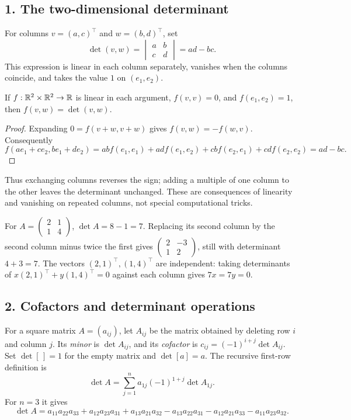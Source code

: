 
\subsection*{1. The two-dimensional determinant}
For columns \(v=(a,c)^\top\) and \(w=(b,d)^\top\), set
\[
 \det(v,w)=\begin{vmatrix}a&b\\c&d\end{vmatrix}=ad-bc.
\]
This expression is linear in each column separately, vanishes when the
columns coincide, and takes the value \(1\) on \((e_1,e_2)\).

\begin{proposition}
If \(f:\mathbb R^2\times\mathbb R^2\to\mathbb R\) is linear in each argument,
\(f(v,v)=0\), and \(f(e_1,e_2)=1\), then \(f(v,w)=\det(v,w)\).
\end{proposition}
\begin{proof}
Expanding \(0=f(v+w,v+w)\) gives \(f(v,w)=-f(w,v)\).
Consequently
\[
 f(ae_1+ce_2,be_1+de_2)
 =abf(e_1,e_1)+adf(e_1,e_2)+cbf(e_2,e_1)+cdf(e_2,e_2)
 =ad-bc .
\]
\end{proof}
Thus exchanging columns reverses the sign; adding a multiple of one column
to the other leaves the determinant unchanged. These are consequences of
linearity and vanishing on repeated columns, not special computational tricks.

\begin{example}
For \(A=\begin{pmatrix}2&1\\1&4\end{pmatrix}\), \(\det A=8-1=7\).
Replacing its second column by the second column minus twice the first gives
\(\begin{pmatrix}2&-3\\1&2\end{pmatrix}\), still with determinant \(4+3=7\).
The vectors \((2,1)^\top,(1,4)^\top\) are independent: taking determinants of
\(x(2,1)^\top+y(1,4)^\top=0\) against each column gives \(7x=7y=0\).
\end{example}

\subsection*{2. Cofactors and determinant operations}
For a square matrix \(A=(a_{ij})\), let \(A_{ij}\) be the matrix obtained by
deleting row \(i\) and column \(j\). Its \emph{minor} is \(\det A_{ij}\),
and its \emph{cofactor} is \(c_{ij}=(-1)^{i+j}\det A_{ij}\).
Set \(\det[\,]=1\) for the empty matrix and \(\det[a]=a\).
The recursive first-row definition is
\[
 \det A=\sum_{j=1}^n a_{1j}(-1)^{1+j}\det A_{1j}.
\]
For \(n=3\) it gives
\[
 \det A=a_{11}a_{22}a_{33}+a_{12}a_{23}a_{31}+a_{13}a_{21}a_{32}
       -a_{13}a_{22}a_{31}-a_{12}a_{21}a_{33}-a_{11}a_{23}a_{32}.
\]


